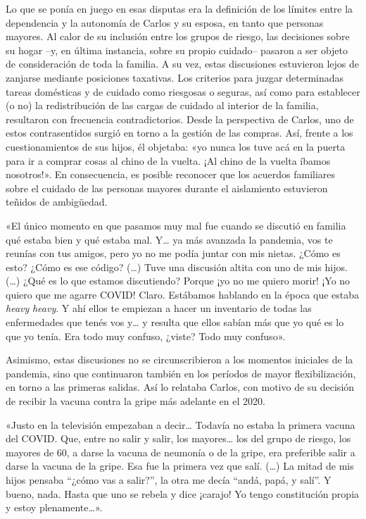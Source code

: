 \begin{refsection}
Lo que se ponía en juego en esas disputas era la definición de los límites entre la dependencia y la autonomía de Carlos y su esposa, en tanto que personas mayores. Al calor de su inclusión entre los grupos de riesgo, las decisiones sobre su hogar –y, en última instancia, sobre su propio cuidado– pasaron a ser objeto de consideración de toda la familia. A su vez, estas discusiones estuvieron lejos de zanjarse mediante posiciones taxativas. Los criterios para juzgar determinadas tareas domésticas y de cuidado como riesgosas o seguras, así como para establecer (o no) la redistribución de las cargas de cuidado al interior de la familia, resultaron con frecuencia contradictorios. Desde la perspectiva de Carlos, uno de estos contrasentidos surgió en torno a la gestión de las compras. Así, frente a los cuestionamientos de sus hijos, él objetaba: «yo nunca los tuve acá en la puerta para ir a comprar cosas al chino de la vuelta. ¡Al chino de la vuelta íbamos nosotros!». En consecuencia, es posible reconocer que los acuerdos familiares sobre el cuidado de las personas mayores durante el aislamiento estuvieron teñidos de ambigüedad.


\begin{gbcita}
«El único momento en que pasamos muy mal fue cuando se discutió en familia qué estaba bien y qué estaba mal. Y… ya más avanzada la pandemia, vos te reunías con tus amigos, pero yo no me podía juntar con mis nietas. ¿Cómo es esto? ¿Cómo es ese código? (…) Tuve una discusión altita con uno de mis hijos. (…) ¿Qué es lo que estamos discutiendo? Porque ¡yo no me quiero morir! ¡Yo no quiero que me agarre COVID! Claro. Estábamos hablando en la época que estaba \emph{heavy} \emph{heavy}. Y ahí ellos te empiezan a hacer un inventario de todas las enfermedades que tenés vos y… y resulta que ellos sabían más que yo qué es lo que yo tenía. Era todo muy confuso, ¿viste? Todo muy confuso».

\end{gbcita}

Asimismo, estas discusiones no se circunscribieron a los momentos iniciales de la pandemia, sino que continuaron también en los períodos de mayor flexibilización, en torno a las primeras salidas. Así lo relataba Carlos, con motivo de su decisión de recibir la vacuna contra la gripe más adelante en el 2020.


\begin{gbcita}
«Justo en la televisión empezaban a decir… Todavía no estaba la primera vacuna del COVID. Que, entre no salir y salir, los mayores… los del grupo de riesgo, los mayores de 60, a darse la vacuna de neumonía o de la gripe, era preferible salir a darse la vacuna de la gripe. Esa fue la primera vez que salí. (…) La mitad de mis hijos pensaba “¿cómo vas a salir?”, la otra me decía “andá, papá, y salí”. Y bueno, nada. Hasta que uno se rebela y dice ¡carajo! Yo tengo constitución propia y estoy plenamente…».


\end{gbcita}
\end{refsection}
